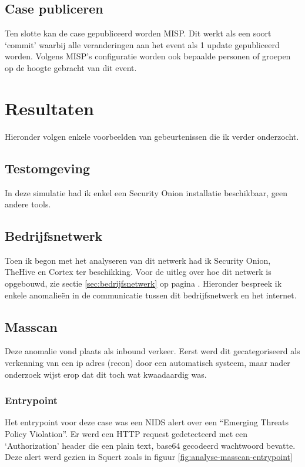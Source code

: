 \documentclass[a4paper,12pt]{report}
\begin{document}
\subsection{Case publiceren}
Ten slotte kan de case gepubliceerd worden MISP.
Dit werkt als een soort `commit' waarbij alle veranderingen aan het event als 1 update gepubliceerd worden.
Volgens MISP's configuratie worden ook bepaalde personen of groepen op de hoogte gebracht van dit event.

\section{Resultaten}
Hieronder volgen enkele voorbeelden van gebeurtenissen die ik verder onderzocht.
\subsection{Testomgeving}
In deze simulatie had ik enkel een Security Onion installatie beschikbaar, geen andere tools.


\subsection{Bedrijfsnetwerk}
Toen ik begon met het analyseren van dit netwerk had ik Security Onion, TheHive en Cortex ter beschikking.
Voor de uitleg over hoe dit netwerk is opgebouwd, zie sectie \ref{sec:bedrijfsnetwerk} op pagina \pageref{sec:bedrijfsnetwerk}.
Hieronder bespreek ik enkele anomalieën in de communicatie tussen dit bedrijfsnetwerk en het internet.

\subsection{Masscan}
Deze anomalie vond plaats als inbound verkeer.
Eerst werd dit gecategoriseerd als verkenning van een ip adres (recon) door een automatisch systeem, maar nader onderzoek wijst erop dat dit toch wat kwaadaardig was.

\subsubsection{Entrypoint}
Het entrypoint voor deze case was een NIDS alert over een ``Emerging Threats Policy Violation''.
Er werd een HTTP request gedetecteerd met een `Authorization' header die een plain text, base64 gecodeerd wachtwoord bevatte.
Deze alert werd gezien in Squert zoals in figuur \ref{fig:analyse-masscan-entrypoint}
\end{document}

